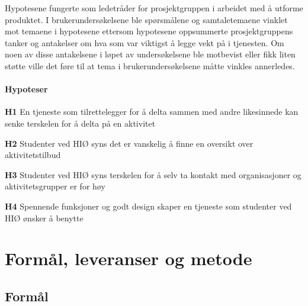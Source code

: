 Hypotesene fungerte som ledetråder for prosjektgruppen i arbeidet med å utforme produktet. I brukerundersøkelsene ble spørsmålene og samtaletemaene vinklet mot temaene i hypotesene ettersom hypotesene oppsummerte prosjektgruppens tanker og antakelser om hva som var viktigst å legge vekt på i tjenesten. Om noen av disse antakelsene i løpet av undersøkelsene ble motbevist eller fikk liten støtte ville det føre til at tema i brukerundersøkelsene måtte vinkles annerledes.

\paragraph{Hypoteser}
\begin{compactitem}
\item[{\bf H1}] En tjeneste som tilrettelegger for å delta sammen med andre likesinnede kan senke terskelen for å delta på en aktivitet
\item[{\bf H2}] Studenter ved HIØ syns det er vanskelig å finne en oversikt over aktivitetstilbud
\item[{\bf H3}] Studenter ved HIØ syns terskelen for å selv ta kontakt med organisasjoner og aktivitetsgrupper er for høy 
\item[{\bf H4}] Spennende funksjoner og godt design skaper en tjeneste som studenter ved HIØ ønsker å benytte
\end{compactitem}

\section{Formål, leveranser og metode}
\label{sec:maal-metode-resultater}

\subsection{Formål}

